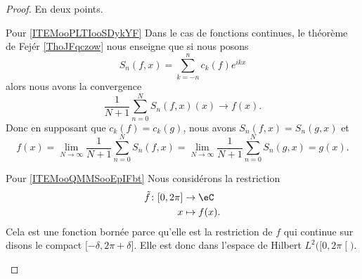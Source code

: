 \begin{proof}
    En deux points.
    \begin{subproof}
    \item[Pour \ref{ITEMooPLTIooSDykYF}]
        Dans le cas de fonctions continues, le théorème de Fejér \ref{ThoJFqczow} nous enseigne que si nous posons
        \begin{equation}
            S_n(f,x)=\sum_{k=-n}^{n}c_k(f) e^{ikx}
        \end{equation}
        alors nous avons la convergence
        \begin{equation}
            \frac{1}{ N+1 }\sum_{n=0}^NS_n(f,x)(x)\to f(x).
        \end{equation}
        Donc en supposant que \( c_k(f)=c_k(g)\), nous avons \( S_n(f,x)=S_n(g,x)\) et
        \begin{equation}
            f(x)=\lim_{N\to \infty} \frac{1}{ N+1 }\sum_{n=0}^NS_n(f,x)=\lim_{N\to \infty} \frac{1}{ N+1 }\sum_{n=0}^NS_n(g,x)=g(x).
        \end{equation}
    \item[Pour \ref{ITEMooQMMSooEpIFbt}]
        Nous considérons la restriction 
        \begin{equation}
            \begin{aligned}
                \tilde f\colon \mathopen[ 0 , 2\pi \mathclose]&\to \eC \\
                x&\mapsto f(x). 
            \end{aligned}
        \end{equation}
        Cela est une fonction bornée parce qu'elle est la restriction de \( f\) qui continue sur disons le compact \( \mathopen[ -\delta , 2\pi+\delta \mathclose]\). Elle est donc dans l'espace de Hilbert \( L^2\big( \mathopen[ 0 , 2\pi \mathclose[ \big)\).


\end{subproof}
\end{proof}
